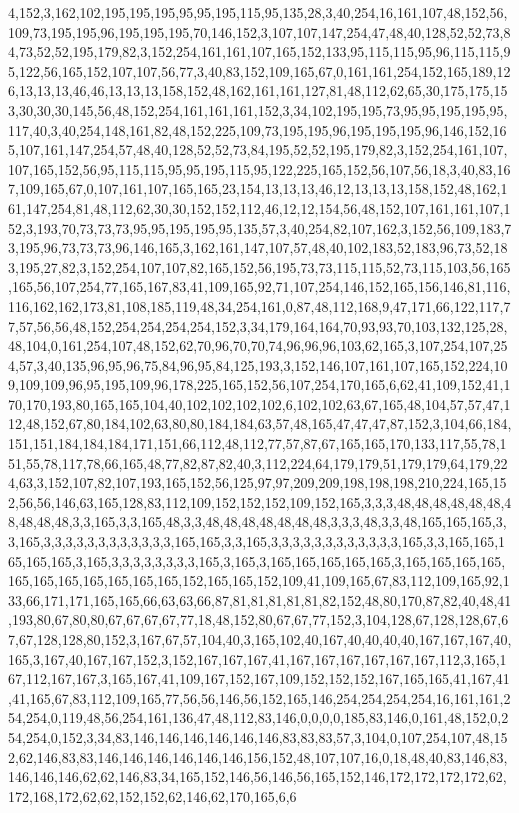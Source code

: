 4,152,3,162,102,195,195,195,95,95,195,115,95,135,28,3,40,254,16,161,107,48,152,56,109,73,195,195,96,195,195,195,70,146,152,3,107,107,147,254,47,48,40,128,52,52,73,84,73,52,52,195,179,82,3,152,254,161,161,107,165,152,133,95,115,115,95,96,115,115,95,122,56,165,152,107,107,56,77,3,40,83,152,109,165,67,0,161,161,254,152,165,189,126,13,13,13,46,46,13,13,13,158,152,48,162,161,161,127,81,48,112,62,65,30,175,175,153,30,30,30,145,56,48,152,254,161,161,161,152,3,34,102,195,195,73,95,95,195,195,95,117,40,3,40,254,148,161,82,48,152,225,109,73,195,195,96,195,195,195,96,146,152,165,107,161,147,254,57,48,40,128,52,52,73,84,195,52,52,195,179,82,3,152,254,161,107,107,165,152,56,95,115,115,95,95,195,115,95,122,225,165,152,56,107,56,18,3,40,83,167,109,165,67,0,107,161,107,165,165,23,154,13,13,13,46,12,13,13,13,158,152,48,162,161,147,254,81,48,112,62,30,30,152,152,112,46,12,12,154,56,48,152,107,161,161,107,152,3,193,70,73,73,73,95,95,195,195,95,135,57,3,40,254,82,107,162,3,152,56,109,183,73,195,96,73,73,73,96,146,165,3,162,161,147,107,57,48,40,102,183,52,183,96,73,52,183,195,27,82,3,152,254,107,107,82,165,152,56,195,73,73,115,115,52,73,115,103,56,165,165,56,107,254,77,165,167,83,41,109,165,92,71,107,254,146,152,165,156,146,81,116,116,162,162,173,81,108,185,119,48,34,254,161,0,87,48,112,168,9,47,171,66,122,117,77,57,56,56,48,152,254,254,254,254,152,3,34,179,164,164,70,93,93,70,103,132,125,28,48,104,0,161,254,107,48,152,62,70,96,70,70,74,96,96,96,103,62,165,3,107,254,107,254,57,3,40,135,96,95,96,75,84,96,95,84,125,193,3,152,146,107,161,107,165,152,224,109,109,109,96,95,195,109,96,178,225,165,152,56,107,254,170,165,6,62,41,109,152,41,170,170,193,80,165,165,104,40,102,102,102,102,6,102,102,63,67,165,48,104,57,57,47,112,48,152,67,80,184,102,63,80,80,184,184,63,57,48,165,47,47,47,87,152,3,104,66,184,151,151,184,184,184,171,151,66,112,48,112,77,57,87,67,165,165,170,133,117,55,78,151,55,78,117,78,66,165,48,77,82,87,82,40,3,112,224,64,179,179,51,179,179,64,179,224,63,3,152,107,82,107,193,165,152,56,125,97,97,209,209,198,198,198,210,224,165,152,56,56,146,63,165,128,83,112,109,152,152,152,109,152,165,3,3,3,48,48,48,48,48,48,48,48,48,48,3,3,165,3,3,165,48,3,3,48,48,48,48,48,48,48,3,3,3,48,3,3,48,165,165,165,3,3,165,3,3,3,3,3,3,3,3,3,3,3,3,165,165,3,3,165,3,3,3,3,3,3,3,3,3,3,3,3,165,3,3,165,165,165,165,165,3,165,3,3,3,3,3,3,3,3,165,3,165,3,165,165,165,165,165,3,165,165,165,165,165,165,165,165,165,165,165,152,165,165,152,109,41,109,165,67,83,112,109,165,92,133,66,171,171,165,165,66,63,63,66,87,81,81,81,81,81,82,152,48,80,170,87,82,40,48,41,193,80,67,80,80,67,67,67,67,77,18,48,152,80,67,67,77,152,3,104,128,67,128,128,67,67,67,128,128,80,152,3,167,67,57,104,40,3,165,102,40,167,40,40,40,40,167,167,167,40,165,3,167,40,167,167,152,3,152,167,167,167,41,167,167,167,167,167,167,112,3,165,167,112,167,167,3,165,167,41,109,167,152,167,109,152,152,152,167,165,165,41,167,41,41,165,67,83,112,109,165,77,56,56,146,56,152,165,146,254,254,254,254,16,161,161,254,254,0,119,48,56,254,161,136,47,48,112,83,146,0,0,0,0,185,83,146,0,161,48,152,0,254,254,0,152,3,34,83,146,146,146,146,146,146,83,83,83,57,3,104,0,107,254,107,48,152,62,146,83,83,146,146,146,146,146,146,156,152,48,107,107,16,0,18,48,40,83,146,83,146,146,146,62,62,146,83,34,165,152,146,56,146,56,165,152,146,172,172,172,172,62,172,168,172,62,62,152,152,62,146,62,170,165,6,6